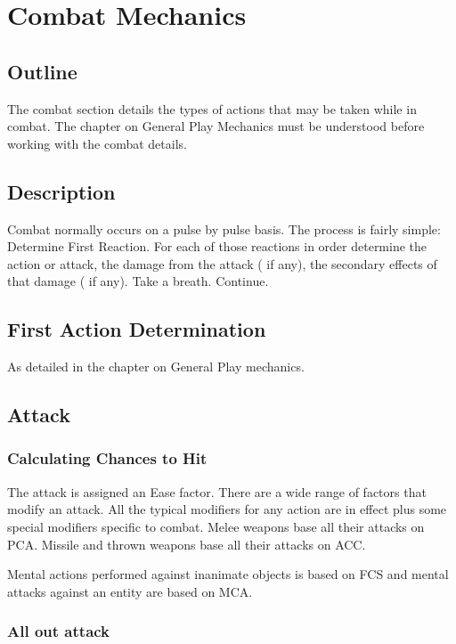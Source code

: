 \chapter{Combat Mechanics}

\section{Outline}

The combat section details the types of actions that may be taken 
while in combat. The chapter on General Play Mechanics must be 
understood before working with the combat details.

\section{Description}

Combat normally occurs on a pulse by pulse basis. The process is 
fairly simple: Determine First Reaction. For each of those reactions in 
order determine the action or attack, the damage from the attack ( if 
any), the secondary effects of that damage ( if any). Take a breath. 
Continue. 

\section{First Action Determination}

As detailed in the chapter on General Play mechanics.

\section{Attack}

\subsection{Calculating Chances to Hit}

The attack is assigned an Ease factor. There are a wide range of factors
that modify an attack. All the typical modifiers for any action are 
in effect plus some special modifiers specific to combat. Melee 
weapons base all their attacks on PCA. Missile and thrown weapons 
base all their attacks on ACC. 

Mental actions performed against inanimate objects is based on FCS
and mental attacks against an entity are based on MCA.

\subsection{All out attack}

